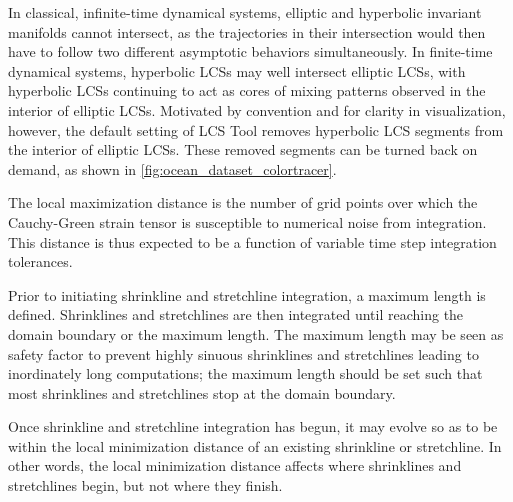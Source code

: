 \documentclass{article}
\begin{document}
In classical, infinite-time dynamical systems, elliptic and hyperbolic invariant manifolds cannot intersect, as the trajectories in their intersection would then have to follow two different asymptotic behaviors simultaneously. In finite-time dynamical systems, hyperbolic LCSs may well intersect elliptic LCSs, with hyperbolic LCSs continuing to act as cores of mixing patterns observed in the interior of elliptic LCSs. Motivated by convention and for clarity in visualization, however, the default setting of LCS Tool removes hyperbolic LCS segments from the interior of elliptic LCSs. These removed segments can be turned back on demand, as shown in \cref{fig:ocean_dataset_colortracer}.

The local maximization distance is the number of grid points over which the Cauchy-Green strain tensor is susceptible to numerical noise from integration. This distance is thus expected to be a function of variable time step integration tolerances.

Prior to initiating shrinkline and stretchline integration, a maximum length is defined. Shrinklines and stretchlines are then integrated until reaching the domain boundary or the maximum length. The maximum length may be seen as safety factor to prevent highly sinuous shrinklines and stretchlines leading to inordinately long computations; the maximum length should be set such that most shrinklines and stretchlines stop at the domain boundary.

Once shrinkline and stretchline integration has begun, it may evolve so as to be within the local minimization distance of an existing shrinkline or stretchline. In other words, the local minimization distance affects where shrinklines and stretchlines begin, but not where they finish.
\end{document}
